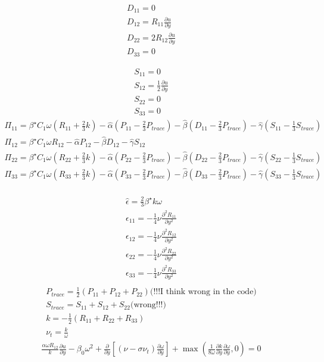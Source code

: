 \documentclass[%
notitlepage,
]{revtex4-1}
\newcommand{\pd}[2]{\frac{\partial #1}{\partial #2}}
\begin{document}
\begin{eqnarray}
  D_{11} = 0\\
  D_{12} = R_{11}\pd{u}{y}\\ 
  D_{22} = 2 R_{12}\pd{u}{y}\\ 
  D_{33} = 0
\end{eqnarray}

\begin{eqnarray}
  S_{11} = 0\\
  S_{12} = \frac{1}{2}\pd{u}{y}\\
  S_{22} = 0\\
  S_{33} = 0
\end{eqnarray}
\begin{eqnarray}
  \Pi_{11} = \beta^{\star}C_1\omega\left(R_{11} + \frac{2}{3}k\right) - \hat{\alpha}\left(P_{11} - \frac{2}{3}P_{trace}\right) - \hat{\beta}\left(D_{11} - \frac{2}{3}P_{trace}\right) - \hat{\gamma}\left(S_{11} - \frac{1}{3}S_{trace}\right)\\
  \Pi_{12} = \beta^{\star}C_1\omega R_{12} - \hat{\alpha} P_{12} - \hat{\beta} D_{12}- \hat{\gamma} S_{12}\\
  \Pi_{22} = \beta^{\star}C_1\omega\left(R_{22} + \frac{2}{3}k\right) - \hat{\alpha}\left(P_{22} - \frac{2}{3}P_{trace}\right) - \hat{\beta}\left(D_{22} - \frac{2}{3}P_{trace}\right) - \hat{\gamma}\left(S_{22} - \frac{1}{3}S_{trace}\right)\\
  \Pi_{33} = \beta^{\star}C_1\omega\left(R_{33} + \frac{2}{3}k\right) - \hat{\alpha}\left(P_{33} - \frac{2}{3}P_{trace}\right) - \hat{\beta}\left(D_{33} - \frac{2}{3}P_{trace}\right) - \hat{\gamma}\left(S_{33} - \frac{1}{3}S_{trace}\right)\\
\end{eqnarray}


\begin{eqnarray}
  \hat{\epsilon} = \frac{2}{3}\beta^{\star}k \omega\\
  \epsilon_{11} = -\frac{1}{4}\nu \pd{^{2}R_{11}}{y^2}\\ 
  \epsilon_{12} = -\frac{1}{4}\nu \pd{^{2}R_{12}}{y^2}\\ 
  \epsilon_{22} = -\frac{1}{4}\nu \pd{^{2}R_{22}}{y^2}\\ 
  \epsilon_{33} = -\frac{1}{4}\nu \pd{^{2}R_{33}}{y^2}\\ 
\end{eqnarray}
\begin{eqnarray}
  P_{trace} = \frac{1}{2}(P_{11} + P_{12} + P_{22}) \text{(!!!I think wrong in the code)}\\
  S_{trace} = S_{11} + S_{12} + S_{22} \text{(wrong!!!)}\\
  k = -\frac{1}{2}\left(R_{11} + R_{22} + R_{33}\right)\\
  \nu_t = \frac{k}{\omega}
\end{eqnarray}
\begin{eqnarray}
\frac{\alpha \omega R_{12}}{k}\pd{u}{y} - \beta_{0}\omega^2 +\pd{}{y}\left[\left(\nu - \sigma\nu_t\right)\pd{\omega}{y}\right] + \max\left(\frac{1}{8\omega}\pd{k}{y}\pd{\omega}{y}, 0\right) = 0 \\
\end{eqnarray}
\end{document}

